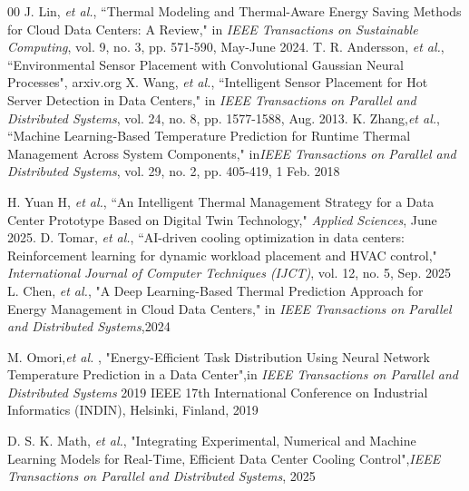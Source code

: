 \documentclass[conference]{IEEEtran}
\begin{document}
\begin{thebibliography}{00}
J. Lin, {\it et al.}, ``Thermal Modeling and Thermal-Aware Energy Saving Methods for Cloud Data Centers: A Review," in {\it IEEE Transactions on Sustainable Computing}, vol. 9, no. 3, pp. 571-590, May-June 2024.
T. R. Andersson, {\it et al.}, ``Environmental Sensor Placement with Convolutional Gaussian Neural Processes", arxiv.org
X. Wang, {\it et al.}, ``Intelligent Sensor Placement for Hot Server Detection in Data Centers," in {\it IEEE Transactions on Parallel and Distributed Systems}, vol. 24, no. 8, pp. 1577-1588, Aug. 2013.
K. Zhang,{\it et al.}, ``Machine Learning-Based Temperature Prediction for Runtime Thermal Management Across System Components," in{\it IEEE Transactions on Parallel and Distributed Systems}, vol. 29, no. 2, pp. 405-419, 1 Feb. 2018

H. Yuan H, {\it et al.}, ``An Intelligent Thermal Management Strategy for a Data Center Prototype Based on Digital Twin Technology," {\it Applied Sciences}, June 2025.
D. Tomar, {\it et al.}, ``AI-driven cooling optimization in data centers: Reinforcement learning for dynamic workload placement and HVAC control," {\it International Journal of Computer Techniques (IJCT)}, vol. 12, no. 5, Sep. 2025
L. Chen, {\it et al.}, "A Deep Learning-Based Thermal Prediction Approach for Energy Management in Cloud Data Centers," in {\it IEEE Transactions on Parallel and Distributed Systems},2024

M. Omori,{\it et al.} , "Energy-Efficient Task Distribution Using Neural Network Temperature Prediction in a Data Center",in {\it IEEE Transactions on Parallel and Distributed Systems} 2019 IEEE 17th International Conference on Industrial Informatics (INDIN), Helsinki, Finland, 2019

D. S. K. Math, {\it et al.}, "Integrating Experimental, Numerical and Machine Learning Models for Real-Time, Efficient Data Center Cooling Control",{\it IEEE Transactions on Parallel and Distributed Systems}, 2025 

\end{thebibliography}
\end{document}
